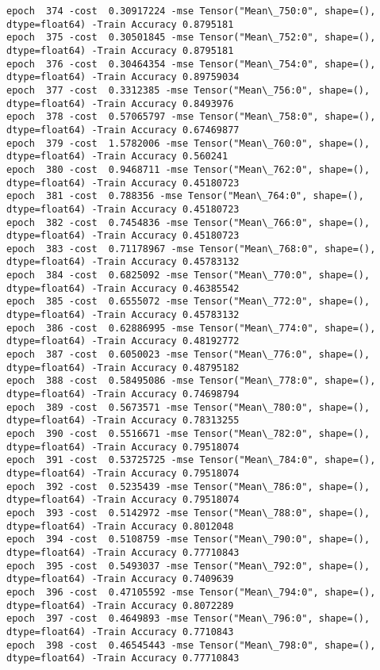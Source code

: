 \documentclass[11pt]{article}
\begin{document}
\begin{Verbatim}[commandchars=\\\{\}]
epoch  374 -cost  0.30917224 -mse Tensor("Mean\_750:0", shape=(), dtype=float64) -Train Accuracy 0.8795181
epoch  375 -cost  0.30501845 -mse Tensor("Mean\_752:0", shape=(), dtype=float64) -Train Accuracy 0.8795181
epoch  376 -cost  0.30464354 -mse Tensor("Mean\_754:0", shape=(), dtype=float64) -Train Accuracy 0.89759034
epoch  377 -cost  0.3312385 -mse Tensor("Mean\_756:0", shape=(), dtype=float64) -Train Accuracy 0.8493976
epoch  378 -cost  0.57065797 -mse Tensor("Mean\_758:0", shape=(), dtype=float64) -Train Accuracy 0.67469877
epoch  379 -cost  1.5782006 -mse Tensor("Mean\_760:0", shape=(), dtype=float64) -Train Accuracy 0.560241
epoch  380 -cost  0.9468711 -mse Tensor("Mean\_762:0", shape=(), dtype=float64) -Train Accuracy 0.45180723
epoch  381 -cost  0.788356 -mse Tensor("Mean\_764:0", shape=(), dtype=float64) -Train Accuracy 0.45180723
epoch  382 -cost  0.7454836 -mse Tensor("Mean\_766:0", shape=(), dtype=float64) -Train Accuracy 0.45180723
epoch  383 -cost  0.71178967 -mse Tensor("Mean\_768:0", shape=(), dtype=float64) -Train Accuracy 0.45783132
epoch  384 -cost  0.6825092 -mse Tensor("Mean\_770:0", shape=(), dtype=float64) -Train Accuracy 0.46385542
epoch  385 -cost  0.6555072 -mse Tensor("Mean\_772:0", shape=(), dtype=float64) -Train Accuracy 0.45783132
epoch  386 -cost  0.62886995 -mse Tensor("Mean\_774:0", shape=(), dtype=float64) -Train Accuracy 0.48192772
epoch  387 -cost  0.6050023 -mse Tensor("Mean\_776:0", shape=(), dtype=float64) -Train Accuracy 0.48795182
epoch  388 -cost  0.58495086 -mse Tensor("Mean\_778:0", shape=(), dtype=float64) -Train Accuracy 0.74698794
epoch  389 -cost  0.5673571 -mse Tensor("Mean\_780:0", shape=(), dtype=float64) -Train Accuracy 0.78313255
epoch  390 -cost  0.5516671 -mse Tensor("Mean\_782:0", shape=(), dtype=float64) -Train Accuracy 0.79518074
epoch  391 -cost  0.53725725 -mse Tensor("Mean\_784:0", shape=(), dtype=float64) -Train Accuracy 0.79518074
epoch  392 -cost  0.5235439 -mse Tensor("Mean\_786:0", shape=(), dtype=float64) -Train Accuracy 0.79518074
epoch  393 -cost  0.5142972 -mse Tensor("Mean\_788:0", shape=(), dtype=float64) -Train Accuracy 0.8012048
epoch  394 -cost  0.5108759 -mse Tensor("Mean\_790:0", shape=(), dtype=float64) -Train Accuracy 0.77710843
epoch  395 -cost  0.5493037 -mse Tensor("Mean\_792:0", shape=(), dtype=float64) -Train Accuracy 0.7409639
epoch  396 -cost  0.47105592 -mse Tensor("Mean\_794:0", shape=(), dtype=float64) -Train Accuracy 0.8072289
epoch  397 -cost  0.4649893 -mse Tensor("Mean\_796:0", shape=(), dtype=float64) -Train Accuracy 0.7710843
epoch  398 -cost  0.46545443 -mse Tensor("Mean\_798:0", shape=(), dtype=float64) -Train Accuracy 0.77710843

\end{Verbatim}
\end{document}
